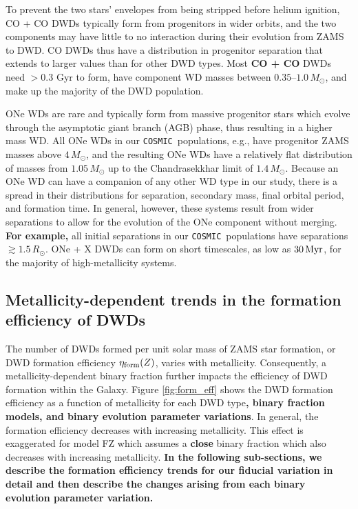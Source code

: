 \documentclass[twocolumn, linenumbers]{aastex631}
\newcommand{\cosmic}{\texttt{COSMIC}}
\begin{document}
To prevent the two stars' envelopes from being stripped before helium ignition, CO + CO DWDs typically form from progenitors in wider orbits, and the two components may have little to no interaction during their evolution from ZAMS to DWD. CO DWDs thus have a distribution in progenitor separation that extends to larger values than for other DWD types. Most \textbf{CO + CO} DWDs need $> 0.3$ Gyr to form, have component WD masses between $0.35$--$1.0\,M_\odot$, and make up the majority of the DWD population. 


ONe WDs are rare and typically form from massive progenitor stars which evolve through the asymptotic giant branch (AGB) phase, thus resulting in a higher mass WD. All ONe WDs in our \cosmic\ populations, e.g., have progenitor ZAMS masses above $4\,M_\odot$, and the resulting ONe WDs have a relatively flat distribution of masses from $1.05\,M_\odot$ up to the Chandrasekkhar limit of $1.4\,M_\odot$. Because an ONe WD can have a companion of any other WD type in our study, there is a spread in their distributions for separation, secondary mass, final orbital period, and formation time. In general, however, these systems result from wider separations to allow for the evolution of the ONe component without merging. \textbf{For example,} all initial separations in our \cosmic \ populations have separations $\gtrsim 1.5\,R_\odot$. ONe + X DWDs can form on short timescales, as low as $30\,\rm{Myr}$, for the majority of high-metallicity systems. 



\subsection{Metallicity-dependent trends in the formation efficiency of DWDs}\label{sec:formeff}
The number of DWDs formed per unit solar mass of ZAMS star formation, or DWD formation efficiency $\eta_{\rm{form}}(Z)$, varies with metallicity. Consequently, a metallicity-dependent binary fraction further impacts the efficiency of DWD formation within the Galaxy. Figure \ref{fig:form_eff} shows the DWD formation efficiency as a function of metallicity for each DWD type\textbf{, binary fraction models, and binary evolution parameter variations}. In general, the formation efficiency decreases with increasing metallicity. This effect is exaggerated for model FZ which assumes a \textbf{close} binary fraction which also decreases with increasing metallicity. \textbf{In the following sub-sections, we describe the formation efficiency trends for our fiducial variation in detail and then describe the changes arising from each binary evolution parameter variation.}
\end{document}
